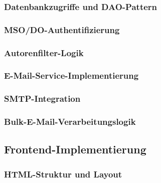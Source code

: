 \documentclass[11pt,a4paper]{article}
\begin{document}
\subsubsection{Datenbankzugriffe und DAO-Pattern}

\subsubsection{MSO/DO-Authentifizierung}

\subsubsection{Autorenfilter-Logik}

\subsubsection{E-Mail-Service-Implementierung}

\subsubsection{SMTP-Integration}

\subsubsection{Bulk-E-Mail-Verarbeitungslogik}

\subsection{Frontend-Implementierung}

\subsubsection{HTML-Struktur und Layout}
\end{document}
